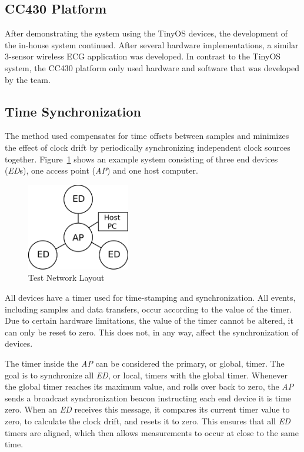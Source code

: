 \documentclass{article}
\begin{document}
\subsection{CC430 Platform}
After demonstrating the system using the TinyOS devices, the development of the in-house system continued. After several hardware implementations, a similar 3-sensor wireless ECG application was developed. In contrast to the TinyOS system, the CC430 platform only used hardware and software that was developed by the team.

\subsection{Time Synchronization}
The method used compensates for time offsets between samples and minimizes the effect of clock drift by periodically synchronizing independent clock sources together. Figure~\ref{fig:network_layout} shows an example system consisting of three end devices (\emph{ED}s), one access point (\emph{AP}) and one host computer. 
\begin{figure}[htb]
\begin{center}
\includegraphics[width=0.4\textwidth]{figures/network-map-test2.pdf}
\end{center}
\caption{Test Network Layout}
\label{fig:network_layout}
\end{figure}
All devices have a timer used for time-stamping and synchronization. All events, including samples and data transfers, occur according to the value of the timer. Due to certain hardware limitations, the value of the timer cannot be altered, it can only be reset to zero. This does not, in any way, affect the synchronization of devices.

The timer inside the \emph{AP} can be considered the primary, or global, timer. The goal is to synchronize all \emph{ED}, or local, timers with the global timer. Whenever the global timer reaches its maximum value, and rolls over back to zero, the \emph{AP} sends a broadcast synchronization beacon instructing each end device it is time zero. When an \emph{ED} receives this message, it compares its current timer value to zero, to calculate the clock drift, and resets it to zero. This ensures that all \emph{ED} timers are aligned, which then allows measurements to occur at close to the same time.
\end{document}
